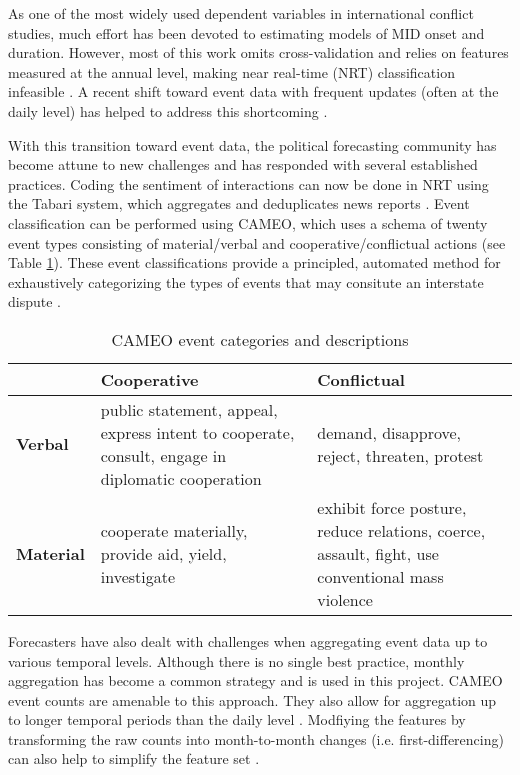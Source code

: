 \documentclass[12pt,letterpaper]{article} %
\begin{document}

As one of the most widely used dependent variables in international conflict studies, much effort has been devoted to estimating models of MID onset and duration. However, most of this work omits cross-validation and relies on features measured at the annual level, making near real-time (NRT) classification infeasible \citep{ward2010perils}. A recent shift toward event data with frequent updates (often at the daily level) has helped to address this shortcoming \citep{gerner1994,gerner:etal:2002,king2003automated,ruggeri2011events,schrodt2013gdelt}. 

With this transition toward event data, the political forecasting community has become attune to new challenges and has responded with several established practices. Coding the sentiment of interactions can now be done in NRT using the Tabari system, which aggregates and deduplicates news reports \citep{o2010crisis,schrodt2009tabari}. Event classification can be performed using CAMEO, which uses a schema of twenty event types consisting of material/verbal and cooperative/conflictual actions (see Table \ref{cameo}). These event classifications provide a principled, automated method for exhaustively categorizing the types of events that may consitute an interstate dispute \citep{ghosn2004mid3}. 

\begin{table}[t]
\caption{CAMEO event categories and descriptions}
\label{cameo}
\begin{center}
\begin{tabular}{lp{2in}p{2in}}
& \textbf{Cooperative} & \textbf{Conflictual} \\
\midrule
\textbf{Verbal} & public statement, appeal, express intent to cooperate, consult, engage in diplomatic cooperation & demand, disapprove, reject, threaten, protest \\
\textbf{Material} & cooperate materially, provide aid, yield, investigate & exhibit force posture, reduce relations, coerce, assault, fight, use conventional mass violence
\end{tabular}
\end{center}
\end{table}

Forecasters have also dealt with challenges when aggregating event data up to various temporal levels. Although there is no single best practice, monthly aggregation has become a common strategy \citep{arva2013improving,yonamine2013event} and is used in this project. CAMEO event counts are amenable to this approach. They also allow for aggregation up to longer temporal periods than the daily level \citep{gerner:etal:2002}. Modfiying the features by transforming the raw counts into month-to-month changes (i.e. first-differencing) can also help to simplify the feature set \citep{Box:1976}. 
\end{document}
